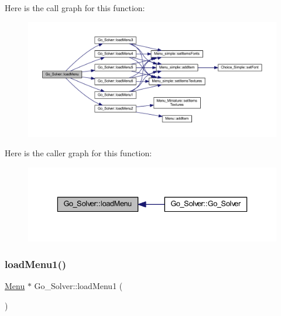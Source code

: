 Here is the call graph for this function\+:
\nopagebreak
\begin{figure}[H]
\begin{center}
\leavevmode
\includegraphics[width=350pt]{class_go___solver_a27ceb252dd57ac88d0dc2dbb04a25e32_cgraph}
\end{center}
\end{figure}
Here is the caller graph for this function\+:
\nopagebreak
\begin{figure}[H]
\begin{center}
\leavevmode
\includegraphics[width=336pt]{class_go___solver_a27ceb252dd57ac88d0dc2dbb04a25e32_icgraph}
\end{center}
\end{figure}
\mbox{\label{class_go___solver_aefc904642aa7fcc3a5f700f921b9c0ab}} 
\subsubsection{\texorpdfstring{load\+Menu1()}{loadMenu1()}}
{\footnotesize\ttfamily \hyperlink{class_menu}{Menu} $\ast$ Go\+\_\+\+Solver\+::load\+Menu1 (\begin{DoxyParamCaption}{ }\end{DoxyParamCaption})\hspace{0.3cm}{\ttfamily [static]}}

